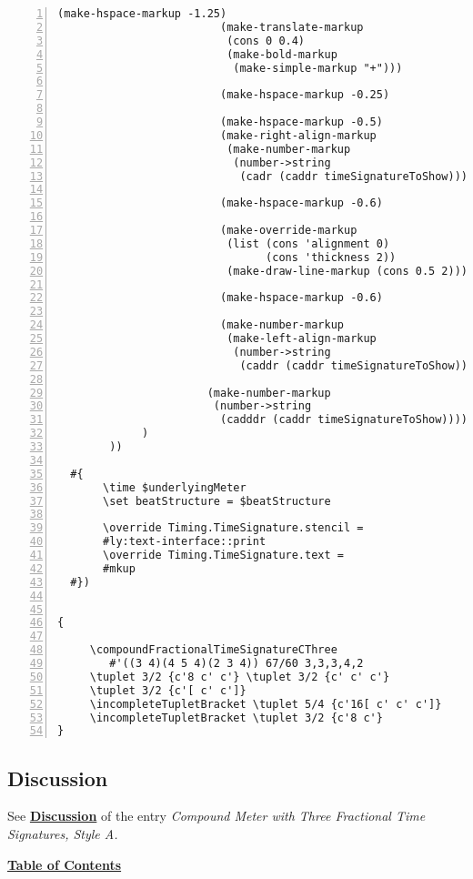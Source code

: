 \begin{Verbatim}[numbers=left,xleftmargin=5mm]
                         (make-hspace-markup -1.25)
                         (make-translate-markup
                          (cons 0 0.4)
                          (make-bold-markup
                           (make-simple-markup "+")))

                         (make-hspace-markup -0.25)

                         (make-hspace-markup -0.5)
                         (make-right-align-markup
                          (make-number-markup
                           (number->string
                            (cadr (caddr timeSignatureToShow)))))

                         (make-hspace-markup -0.6)

                         (make-override-markup
                          (list (cons 'alignment 0)
                                (cons 'thickness 2))
                          (make-draw-line-markup (cons 0.5 2)))

                         (make-hspace-markup -0.6)

                         (make-number-markup
                          (make-left-align-markup
                           (number->string
                            (caddr (caddr timeSignatureToShow)))))))

                       (make-number-markup
                        (number->string
                         (cadddr (caddr timeSignatureToShow)))))))))
             )
        ))

  #{
       \time $underlyingMeter
       \set beatStructure = $beatStructure

       \override Timing.TimeSignature.stencil =
       #ly:text-interface::print
       \override Timing.TimeSignature.text =
       #mkup
  #})


{

     \compoundFractionalTimeSignatureCThree 
     	#'((3 4)(4 5 4)(2 3 4)) 67/60 3,3,3,4,2
     \tuplet 3/2 {c'8 c' c'} \tuplet 3/2 {c' c' c'}
     \tuplet 3/2 {c'[ c' c']}
     \incompleteTupletBracket \tuplet 5/4 {c'16[ c' c' c']}
     \incompleteTupletBracket \tuplet 3/2 {c'8 c'}
}

\end{Verbatim}


\subsection{Discussion}
See \hyperref[sec:compoundfractionalmeter_discussion_two]{\textbf{Discussion}} of the entry \textit{Compound Meter with Three Fractional Time Signatures, Style A.}


\hyperref[sec:toc]{\textbf{Table of Contents}}

\vfill \break

